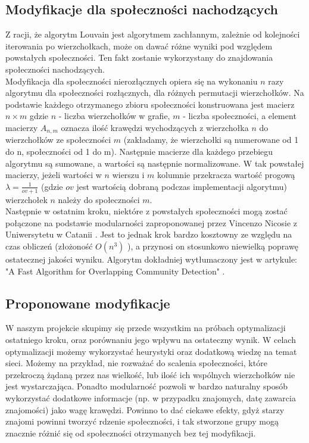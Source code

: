 \documentclass{article}
\begin{document}
\subsection{Modyfikacje dla społeczności nachodzących}
Z racji, że algorytm Louvain jest algorytmem zachłannym, zależnie od kolejności iterowania po wierzchołkach, może on dawać różne wyniki pod względem powstałych społeczności. Ten fakt zostanie wykorzystany do znajdowania społeczności nachodzących.\\
Modyfikacja dla społeczności nierozłącznych opiera się na wykonaniu $n$ razy algorytmu dla społeczności rozłącznych, dla różnych permutacji wierzchołków. Na podstawie każdego otrzymanego zbioru społeczności konstruowana jest macierz $n \times m$ gdzie $n$ - liczba wierzchołków w grafie, $m$ - liczba społeczności, a element macierzy $A_{n,m}$ oznacza ilość krawędzi wychodzących z wierzchołka $n$ do wierzchołków ze społeczności $m$ (zakładamy, że wierzchołki są numerowane od 1 do n, społeczności od 1 do m). Następnie macierze dla każdego przebiegu algorytmu są sumowane, a wartości są następnie normalizowane. W tak powstałej macierzy, jeżeli wartości w $n$ wierszu i $m$ kolumnie przekracza wartość progową $\lambda = \frac{1}{ov + 1}$ (gdzie $ov$ jest wartością dobraną podczas implementacji algorytmu) wierzchołek $n$ należy do społeczności $m$. \\
Następnie w ostatnim kroku, niektóre z powstałych społeczności mogą zostać połączone na podstawie modularności zaproponowanej przez Vincenzo Nicosie z Uniwersytetu w Catanii \cite{pw-paper2} . Jest to jednak krok bardzo kosztowny ze względu na czas obliczeń (złożoność $O(n^3)$ ), a przynosi on stosunkowo niewielką poprawę ostatecznej jakości wyniku. Algorytm dokładniej wytłumaczony jest w artykule: "A Fast Algorithm for Overlapping Community Detection" \cite{pw-paper3}.
\subsection{Proponowane modyfikacje}
W naszym projekcie skupimy się przede wszystkim na próbach optymalizacji ostatniego kroku, oraz porównaniu jego wpływu na ostateczny wynik. W celach optymalizacji możemy wykorzystać heurystyki oraz dodatkową wiedzę na temat sieci. Możemy na przykład, nie rozważać do scalenia społeczności, które przekroczą żądaną przez nas wielkość, lub ilość ich wspólnych wierzchołków nie jest wystarczająca.
Ponadto modularność pozwoli w bardzo naturalny sposób wykorzystać dodatkowe informacje (np. w przypadku znajomych, datę zawarcia znajomości) jako wagę krawędzi. Powinno to dać ciekawe efekty, gdyż starzy znajomi powinni tworzyć rdzenie społeczności, i tak stworzone grupy mogą znacznie różnić się od społeczności otrzymanych bez tej modyfikacji.\\
\end{document}
